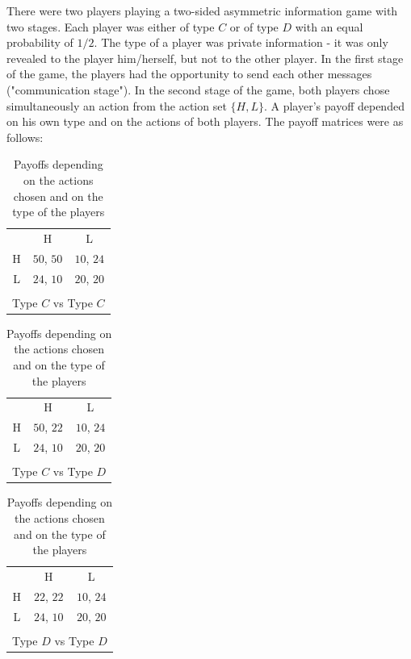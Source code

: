 \documentclass[12pt]{article}
\theoremstyle{break}
\begin{document}
There were two players playing a two-sided asymmetric information game with two stages. Each player was either of type $C$ or of type $D$ with an equal probability of $1/2$. The type of a player was private information - it was only revealed to the player him/herself, but not to the other player. In the first stage of the game, the players had the opportunity to send each other messages ("communication stage"). In the second stage of the game, both players chose simultaneously an action from the action set $\{H,L\}$. A player's payoff depended on his own type and on the actions of both players. The payoff matrices were as follows:
	\begin{table}[!htbp]
    	\centering
		\begin{tabular}{c c c}
			  & H   & L   \\ \cline{2-3}
			H & \multicolumn{1}{|c|}{$50$, $50$} & \multicolumn{1}{c|}{$10$, $24$} \\ \cline{2-3}
			L & \multicolumn{1}{|c|}{$24$, $10$} & \multicolumn{1}{c|}{$20$, $20$} \\ \cline{2-3}
            \\
            \multicolumn{3}{c}{Type $C$ vs Type $C$} \\
		\end{tabular}
		\hfill
   		\begin{tabular}{c c c}
			  & H   & L   \\ \cline{2-3}
			H & \multicolumn{1}{|c|}{$50$, $22$} & \multicolumn{1}{c|}{$10$, $24$} \\ \cline{2-3}
			L & \multicolumn{1}{|c|}{$24$, $10$} & \multicolumn{1}{c|}{$20$, $20$} \\ \cline{2-3}
			\\
            \multicolumn{3}{c}{Type $C$ vs Type $D$} \\
		\end{tabular}
        \hfill
   		\begin{tabular}{c c c}
			  & H   & L   \\ \cline{2-3}
			H & \multicolumn{1}{|c|}{$22$, $22$} & \multicolumn{1}{c|}{$10$, $24$} \\ \cline{2-3}
			L & \multicolumn{1}{|c|}{$24$, $10$} & \multicolumn{1}{c|}{$20$, $20$} \\ \cline{2-3}
			\\
            \multicolumn{3}{c}{Type $D$ vs Type $D$} \\
		\end{tabular}
        \caption{Payoffs depending on the actions chosen and on the type of the players}\label{game_table}
	\end{table}
\end{document}

